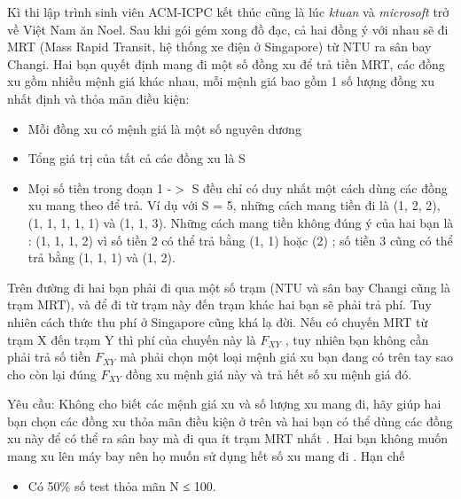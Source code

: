 Kì thi lập trình sinh viên ACM-ICPC kết thúc cũng là lúc   \textit{    ktuan   }   và   \textit{    microsoft   }   trở về Việt Nam ăn Noel. Sau khi gói gém xong đồ đạc, cả hai đồng ý với nhau sẽ đi MRT (Mass Rapid Transit, hệ thống xe điện ở Singapore) từ NTU ra sân bay Changi. Hai bạn quyết định mang đi một số đồng xu để trả tiền MRT, các đồng xu gồm nhiều mệnh giá khác nhau, mỗi mệnh giá bao gồm 1 số lượng đồng xu nhất định và thỏa mãn điều kiện:  
\begin{itemize}
	\item     Mỗi đồng xu có mệnh giá là một số nguyên dương   
	\item     Tổng giá trị của tất cả các đồng xu là S   
	\item     Mọi số tiền trong đoạn 1 -$>$ S đều chỉ có duy nhất một cách dùng các đồng xu mang theo để trả. Ví dụ với S = 5, những cách mang tiền đi là (1, 2, 2), (1, 1, 1, 1, 1) và (1, 1, 3). Những cách mang tiền không đúng ý của hai bạn là : (1, 1, 1, 2) vì số tiền 2 có thể trả bằng (1, 1) hoặc (2) ; số tiền 3 cũng có thể trả bằng (1, 1, 1) và (1, 2).   
\end{itemize}

   Trên đường đi hai bạn phải đi qua một số trạm (NTU và sân bay Changi cũng là trạm MRT), và để đi từ trạm này đến trạm khác hai bạn sẽ phải trả phí. Tuy nhiên cách thức thu phí ở Singapore cũng khá lạ đời. Nếu có chuyến MRT từ trạm X đến trạm Y thì phí của chuyến này là $F_{XY}$   , tuy nhiên bạn không cần phải trả số tiền $F_{XY}$   mà       phải chọn một loại mệnh giá xu         bạn đang có        trên tay sao cho còn lại đúng $F_{XY}$    đồng xu mệnh giá này và trả hết số xu mệnh giá đó.     

       Yêu cầu:      Không cho biết các mệnh giá xu và số lượng xu mang đi, hãy giúp hai bạn chọn các đồng xu       thỏa mãn điều kiện ở trên      và hai bạn có thể dùng các đồng xu này để       có thể ra sân bay      mà       đi qua ít trạm MRT nhất      . Hai bạn không muốn mang xu lên máy bay nên họ muốn       sử dụng hết số xu mang đi      .
Hạn chế
\begin{itemize}
	\item     Có 50\% số test thỏa mãn N ≤ 100.   
\end{itemize}